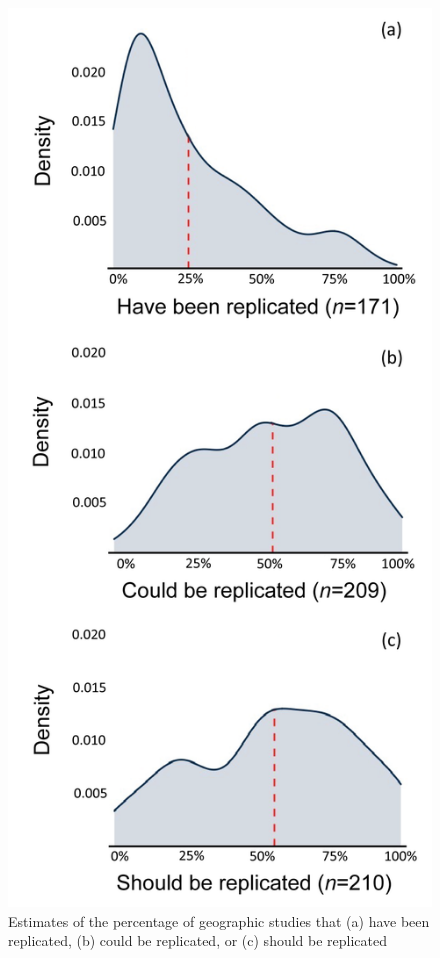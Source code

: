 \documentclass[]{interact}
\theoremstyle{plain}%
\theoremstyle{definition}
\theoremstyle{remark}
\begin{document}
\begin{figure}[hbt!]
    \centering
    \includegraphics[scale=0.5]{results/figures/Fig2-Q12-HCS.png}
    \caption{Estimates of the percentage of geographic studies that (a) have been replicated, (b) could be replicated, or (c) should be replicated}
    \label{fig:Q12-HCS}
\end{figure}
\end{document}
